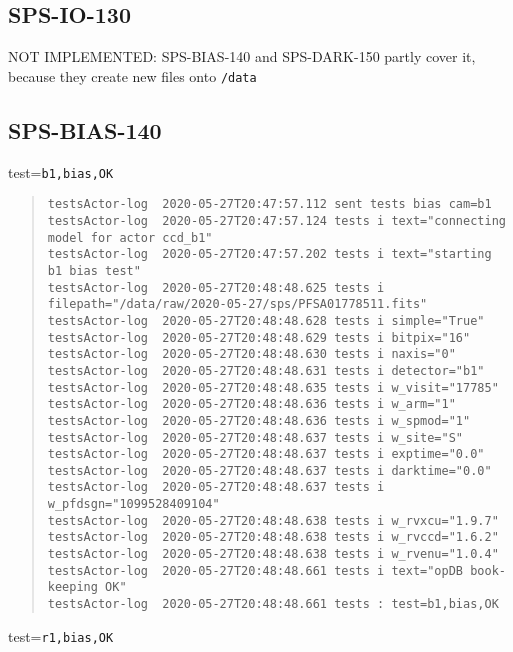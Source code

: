 \subsection{SPS-IO-130}
\label{sec:tc-130}
NOT IMPLEMENTED: SPS-BIAS-140 and SPS-DARK-150 partly cover it, because they create new files onto 
\texttt{/data}

\subsection{SPS-BIAS-140}
\label{sec:tc-140}

test=\texttt{b1,bias,OK}

\begin{quote}
\begin{tiny}
\begin{verbatim}
testsActor-log  2020-05-27T20:47:57.112 sent tests bias cam=b1
testsActor-log  2020-05-27T20:47:57.124 tests i text="connecting model for actor ccd_b1"
testsActor-log  2020-05-27T20:47:57.202 tests i text="starting b1 bias test"
testsActor-log  2020-05-27T20:48:48.625 tests i filepath="/data/raw/2020-05-27/sps/PFSA01778511.fits"
testsActor-log  2020-05-27T20:48:48.628 tests i simple="True"
testsActor-log  2020-05-27T20:48:48.629 tests i bitpix="16"
testsActor-log  2020-05-27T20:48:48.630 tests i naxis="0"
testsActor-log  2020-05-27T20:48:48.631 tests i detector="b1"
testsActor-log  2020-05-27T20:48:48.635 tests i w_visit="17785"
testsActor-log  2020-05-27T20:48:48.636 tests i w_arm="1"
testsActor-log  2020-05-27T20:48:48.636 tests i w_spmod="1"
testsActor-log  2020-05-27T20:48:48.637 tests i w_site="S"
testsActor-log  2020-05-27T20:48:48.637 tests i exptime="0.0"
testsActor-log  2020-05-27T20:48:48.637 tests i darktime="0.0"
testsActor-log  2020-05-27T20:48:48.637 tests i w_pfdsgn="1099528409104"
testsActor-log  2020-05-27T20:48:48.638 tests i w_rvxcu="1.9.7"
testsActor-log  2020-05-27T20:48:48.638 tests i w_rvccd="1.6.2"
testsActor-log  2020-05-27T20:48:48.638 tests i w_rvenu="1.0.4"
testsActor-log  2020-05-27T20:48:48.661 tests i text="opDB book-keeping OK"
testsActor-log  2020-05-27T20:48:48.661 tests : test=b1,bias,OK
\end{verbatim}
\end{tiny}
\end{quote}

\noindent test=\texttt{r1,bias,OK}

